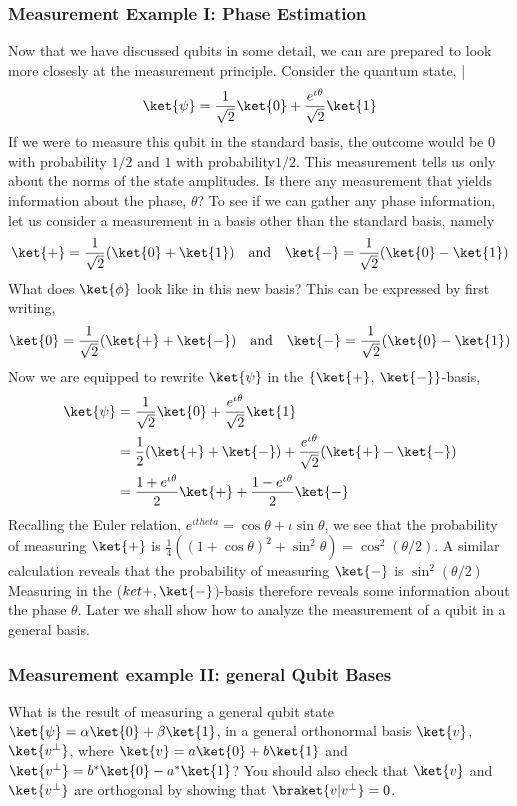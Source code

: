 \documentclass[12pt, oneside]{book}
\theoremstyle{definition}
\theoremstyle{definition}
\theoremstyle{remark}
\begin{document}
\subsubsection{Measurement Example I: Phase Estimation}
Now that we have discussed qubits in some detail, we can are prepared to
look more closesly at the measurement principle. Consider the quantum
state,
|\[
\ket{\psi}=\frac{1}{\sqrt{2}}\ket{0}+\frac{e^{\iota\theta}}{\sqrt{2}}\ket{1}
\]
If we were to measure this qubit in the standard basis, the outcome would
be $0$ with probability $1/2$ and $1$ with probability$ 1/2$. This measurement
tells us only about the norms of the state amplitudes. Is there any measurement that yields information about the phase, $\theta$?
To see if we can gather any phase information, let us consider a measurement in a basis other than the standard basis, namely
\[
\ket{+}=\frac{1}{\sqrt{2}}(\ket{0}+\ket{1}) \quad \text{and}\quad \ket{-}=\frac{1}{\sqrt{2}}(\ket{0}-\ket{1})
\]
What does $\ket{\phi}$ look like in this new basis? This can be expressed by first
writing,
\[
\ket{0}=\frac{1}{\sqrt{2}}(\ket{+}+\ket{-}) \quad \text{and} \quad \ket{-}=\frac{1}{\sqrt{2}}(\ket{0}-\ket{1})
\]
Now we are equipped to rewrite $\ket{\psi}$ in the $\{\ket{+}$, $\ket{-}\}$-basis,
\begin{align*}
\ket{\psi}&=\frac{1}{\sqrt{2}}\ket{0}+\frac{e^{\iota\theta}}{\sqrt{2}}\ket{1}\\
&=\frac{1}{2}(\ket{+}+\ket{-})+\frac{e^{\iota\theta}}{\sqrt{2}}(\ket{+}-\ket{-})\\
&=\frac{1+e^{\iota\theta}}{2}\ket{+}+\frac{1-e^{\iota\theta}}{2}\ket{-}
\end{align*}
Recalling the Euler relation, $e^{\iota theta}=\cos \theta+\iota\sin \theta$, we see that the probability
of measuring $\ket{+}$ is $\frac{1}{4}((1+\cos \theta)^2+\sin^2 \theta)=\cos^2 (\theta/2)$. A similar calculation reveals that the probability of measuring $\ket{-}$ is $\sin^2 (\theta/2)$ Measuring
in the ($ket{+},\ket{-}$)-basis therefore reveals some information about the phase $\theta$.
Later we shall show how to analyze the measurement of a qubit in a
general basis.

\subsubsection{Measurement example II: general Qubit Bases}
What is the result of measuring a general qubit state $\ket{\psi}=\alpha\ket{0}+\beta\ket{1}$, in
a general orthonormal basis $\ket{v}$, $\ket{v^{\perp}}$, where $\ket{v}=a\ket{0}+b\ket{1}$ and $\ket{v^{\perp}}=b^*\ket{0}-a^*\ket{1}$? You should also check that $\ket{v}$ and $\ket{v^{\perp}}$ are orthogonal by
showing that $\braket{v|v^{\perp}}=0$.
\end{document}
